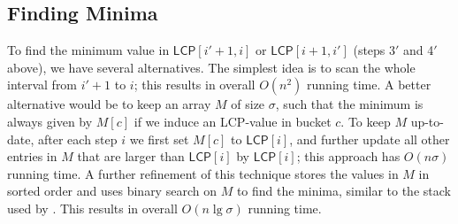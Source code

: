 \documentclass[11pt,onecolumn,final]{article} \usepackage[latin1]{inputenc}
\newcommand{\LCP}[0]{\mathsf{LCP}}
\theoremstyle{plain}
\theoremstyle{remark}
\begin{document}
\subsection{Finding Minima}
\label{sect:rmq}
To find the minimum value in $\LCP[i'+1,i]$ or $\LCP[i+1,i']$ (steps 3$'$ and 4$'$ above), we have several alternatives. The simplest idea is to scan the whole interval from $i'+1$ to $i$; this results in overall $O(n^2)$ running time. A better alternative would be to keep an array $M$ of size $\sigma$, such that the minimum is always given by $M[c]$ if we induce an LCP-value in bucket $c$. To keep $M$ up-to-date, after each step $i$ we first set $M[c]$ to $\LCP[i]$, and further update all other entries in $M$ that are larger than $\LCP[i]$ by $\LCP[i]$; this approach has $O(n\sigma)$ running time. A further refinement of this technique stores the values in $M$ in sorted order and uses binary search on $M$ to find the minima, similar to the stack used by \cite{gog11fast}. This results in overall $O(n\lg\sigma)$ running time.
\end{document}
